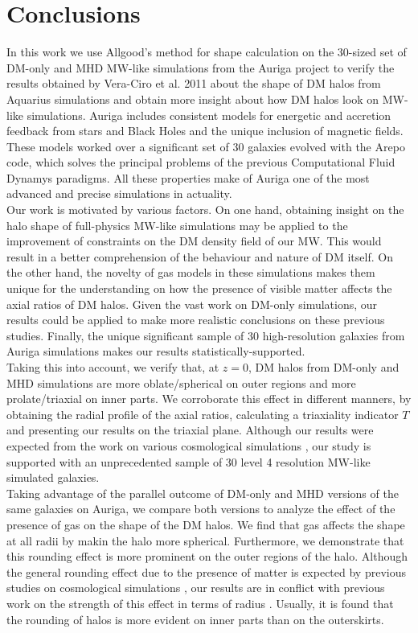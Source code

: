 \chapter{Conclusions}

In this work we use Allgood's method for shape calculation on the 30-sized set of DM-only and MHD MW-like simulations from the Auriga project to verify the results obtained by Vera-Ciro et al. 2011 about the shape of DM halos from Aquarius simulations and obtain more insight about how DM halos look on MW-like simulations. Auriga includes consistent models for energetic and accretion feedback from stars and Black Holes and the unique inclusion of magnetic fields. These models worked over a significant set of 30 galaxies evolved with the Arepo code, which solves the principal problems of the previous Computational Fluid Dynamys paradigms. All these properties make of Auriga one of the most advanced and precise simulations in actuality.\\ 

Our work is motivated by various factors. On one hand, obtaining insight on the halo shape of full-physics MW-like simulations may be applied to the improvement of constraints on the DM density field of our MW. This would result in a better comprehension of the behaviour and nature of DM itself. On the other hand, the novelty of gas models in these simulations makes them unique for the understanding on how the presence of visible matter affects the axial ratios of DM halos. Given the vast work on DM-only simulations, our results could be applied to make more realistic conclusions on these previous studies. Finally, the unique significant sample of 30 high-resolution galaxies from Auriga simulations makes our results statistically-supported.\\  

Taking this into account, we verify that, at $z=0$, DM halos from DM-only and MHD simulations are more oblate/spherical on outer regions and more prolate/triaxial on inner parts. We corroborate this effect in different manners, by obtaining the radial profile of the axial ratios, calculating a triaxiality indicator $T$ and presenting our results on the triaxial plane. Although our results were expected from the work on various cosmological simulations \cite{various}, our study is supported with an unprecedented sample of 30 level 4 resolution MW-like simulated galaxies.\\

Taking advantage of the parallel outcome of DM-only and MHD versions of the same galaxies on Auriga, we compare both versions to analyze the effect of the presence of gas on the shape of the DM halos. We find that gas affects the shape at all radii by makin the halo more spherical. Furthermore, we demonstrate that this rounding effect is more prominent on the outer regions of the halo. Although the general rounding effect due to the presence of matter is expected by previous studies on cosmological simulations \cite{}, our results are in conflict with previous work on the strength of this effect in terms of radius \cite{}. Usually, it is found that the rounding of halos is more evident on inner parts than on the outerskirts.\\

